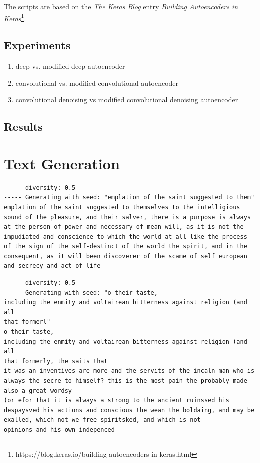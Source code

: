 \documentclass{article}[]
\begin{document}
The scripts are based on the \emph{The Keras Blog} entry \emph{Building Autoencoders in Keras}\footnote{https://blog.keras.io/building-autoencoders-in-keras.html}.

\subsection{Experiments}

\begin{enumerate}
	\item{deep vs. modified deep autoencoder}
	\item{convolutional vs. modified convolutional autoencoder}
	\item{convolutional denoising vs modified convolutional denoising autoencoder}
\end{enumerate}

\subsection{Results}




\appendix
\section{Text Generation}
\begin{lstlisting}[label=nietzsche-low-diverse, caption={riginal script with Nietzsche after 60 epochs and a diversity of 0.5}]
----- diversity: 0.5
----- Generating with seed: "emplation of the saint suggested to them"
emplation of the saint suggested to themselves to the intelligious sound of the pleasure, and their salver, there is a purpose is always at the person of power and necessary of mean will, as it is not the impudiated and conscience to which the world at all like the process of the sign of the self-destinct of the world the spirit, and in the consequent, as it will been discoverer of the scame of self european and secrecy and act of life 
\end{lstlisting}

\begin{lstlisting}[label=nietzsche-adjusted-low-diverse, caption={adjusted original script with Nietzsche after 60 epochs and a diversity of 0.5}]
----- diversity: 0.5
----- Generating with seed: "o their taste,
including the enmity and voltairean bitterness against religion (and all
that formerl"
o their taste,
including the enmity and voltairean bitterness against religion (and all
that formerly, the saits that
it was an inventives are more and the servits of the incaln man who is always the secre to himself? this is the most pain the probably made also a great wordsy
(or efor that it is always a strong to the ancient ruinssed his despaysved his actions and conscious the wean the boldaing, and may be exalled, which not we free spiritsked, and which is not
opinions and his own indepenced
\end{lstlisting}
\end{document}

